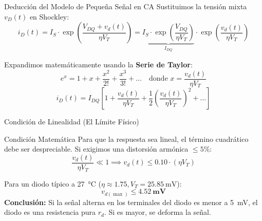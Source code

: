 \documentclass[10pt, aspectratio=169]{beamer}
\begin{document}
\begin{frame}{Deducción del Modelo de Pequeña Señal en CA}
  Sustituimos la tensión mixta $v_D(t)$ en Shockley:
  \begin{equation*}
      i_D(t) = I_S \cdot \exp\left(\frac{V_{DQ} + v_d(t)}{\eta V_T}\right) = \underbrace{I_S \cdot \exp\left(\frac{V_{DQ}}{\eta V_T}\right)}_{I_{DQ}} \cdot \exp\left(\frac{v_d(t)}{\eta V_T}\right)
  \end{equation*}
  
  \vspace{0.2cm}
  Expandimos matemáticamente usando la \textbf{Serie de Taylor}:
  \begin{equation*}
      e^x = 1 + x + \frac{x^2}{2!} + \frac{x^3}{3!} + \dots \quad \text{donde } x = \frac{v_d(t)}{\eta V_T}
  \end{equation*}
  \begin{equation*}
      i_D(t) = I_{DQ} \left[ 1 + \frac{v_d(t)}{\eta V_T} + \frac{1}{2}\left(\frac{v_d(t)}{\eta V_T}\right)^2 + \dots \right]
  \end{equation*}
\end{frame}

\begin{frame}{Condición de Linealidad (El Límite Físico)}
  \begin{block}{Condición Matemática}
      Para que la respuesta sea lineal, el término cuadrático debe ser despreciable. Si exigimos una distorsión armónica $\le 5\%$:
      \begin{equation*}
          \frac{v_d(t)}{\eta V_T} \ll 1 \implies v_d(t) \le 0.10 \cdot (\eta V_T)
      \end{equation*}
  \end{block}
  
  \vspace{0.2cm}
  Para un diodo típico a \qty{27}{\celsius} ($\eta \approx 1.75, V_T = \qty{25.85}{\milli\volt}$):
  \begin{equation*}
      v_{d(\max)} \le \mathbf{\qty{4.52}{\milli\volt}}
  \end{equation*}
  \alert{\textbf{Conclusión:}} Si la señal alterna en los terminales del diodo es menor a \qty{5}{\milli\volt}, el diodo es una resistencia pura $r_d$. Si es mayor, se deforma la señal.
\end{frame}
\end{document}
